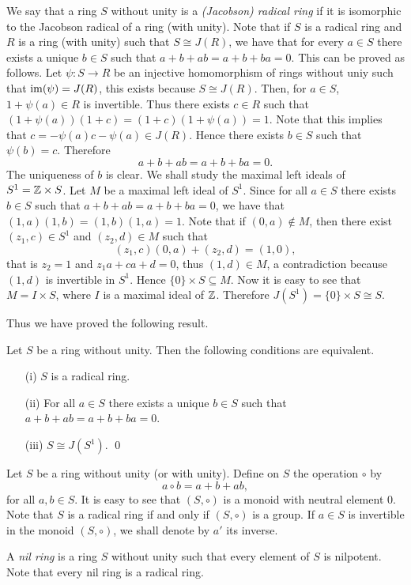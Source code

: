 We say that a ring $S$ without unity is a \emph{(Jacobson) radical ring} if it is isomorphic to the Jacobson radical of a ring (with unity). Note that if $S$ is a radical ring and $R$ is a ring (with unity) such that $S\cong J(R)$, we have that for every $a\in S$ there exists a unique $b\in S$ such that $a+b+ab=a+b+ba=0$. This can be proved as follows. Let $\psi\colon S\rightarrow R$ be an injective homomorphism of rings without uniy such that $\operatorname{im}(\psi)=J(R)$, this exists because $S\cong J(R)$. Then, for $a\in S$,
$1+\psi(a)\in R$ is invertible. Thus there exists $c\in R$ such that $(1+\psi(a))(1+c)=(1+c)(1+\psi(a))=1$. Note that this implies that
$c=-\psi(a)c-\psi(a)\in J(R)$. Hence there exists $b\in S$ such that $\psi(b)=c$. Therefore 
$$a+b+ab=a+b+ba=0.$$ 
The uniqueness of $b$ is clear. 
We shall study the  maximal left ideals of $S^1=\mathbb{Z}\times S$. Let $M$ be a maximal left ideal of $S^1$. Since for all $a\in S$ there exists $b\in S$ such that $a+b+ab=a+b+ba=0$, we have that $(1,a)(1,b)=(1,b)(1,a)=1$.
Note that if $(0,a)\notin M$, then there exist $(z_1,c)\in S^1$ and $(z_2,d)\in M$ such that
$$(z_1,c)(0,a)+(z_2,d)=(1,0),$$
that is $z_2=1$ and $z_1a+ca+d=0$, thus $(1,d)\in M$, a contradiction because $(1,d)$ is invertible in $S^1$. Hence $\{0\}\times S\subseteq M$. Now it is easy to see that $M=I\times S$, where $I$ is a maximal ideal of $\mathbb{Z}$. Therefore
$J(S^1)=\{0\}\times S\cong S$. 

Thus we have proved the following result.
\begin{proposition}\label{Prop5.1}
	Let $S$ be a ring without unity. Then the following conditions are equivalent.
	\begin{itemize}
		\item[(i)] $S$ is a radical ring.
		\item[(ii)] For all $a\in S$ there exists a unique $b\in S$ such that $a+b+ab=a+b+ba=0$.
		\item[(iii)] $S\cong J(S^1)$. \qed 
	\end{itemize}
	\end{proposition}  

Let $S$ be a ring without unity (or with unity).
Define on $S$ the operation $\circ$ by
$$a\circ b=a+b+ab,$$
for all $a,b\in S$. It is easy to see that $(S,\circ)$ is a monoid with neutral element $0$.
Note that $S$ is a radical ring if and only if $(S,\circ)$ is a group. If $a\in S$ is invertible in the monoid $(S,\circ)$, we shall denote by $a'$ its inverse.

A \emph{nil ring} is a ring $S$ without unity such that every element of $S$ is nilpotent. Note that every nil ring is a radical ring.

